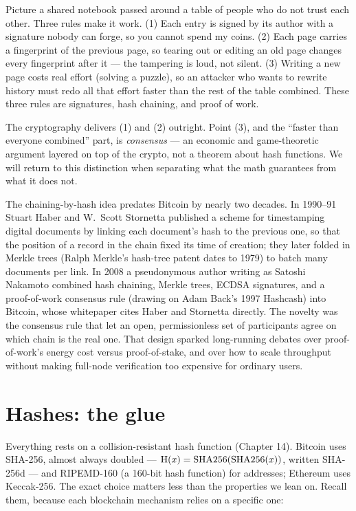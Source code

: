 \begin{intuitionbox}
Picture a shared notebook passed around a table of people who do not trust each other. Three rules make it work. (1) Each entry is signed by its author with a signature nobody can forge, so you cannot spend my coins. (2) Each page carries a fingerprint of the previous page, so tearing out or editing an old page changes every fingerprint after it --- the tampering is loud, not silent. (3) Writing a new page costs real effort (solving a puzzle), so an attacker who wants to rewrite history must redo all that effort faster than the rest of the table combined. These three rules are signatures, hash chaining, and proof of work.
\end{intuitionbox}

The cryptography delivers (1) and (2) outright. Point (3), and the ``faster than everyone combined'' part, is \emph{consensus} --- an economic and game-theoretic argument layered on top of the crypto, not a theorem about hash functions. We will return to this distinction when separating what the math guarantees from what it does not.

\begin{historybox}
The chaining-by-hash idea predates Bitcoin by nearly two decades. In 1990--91 Stuart Haber and W.~Scott Stornetta published a scheme for timestamping digital documents by linking each document's hash to the previous one, so that the position of a record in the chain fixed its time of creation; they later folded in Merkle trees (Ralph Merkle's hash-tree patent dates to 1979) to batch many documents per link. In 2008 a pseudonymous author writing as Satoshi Nakamoto combined hash chaining, Merkle trees, ECDSA signatures, and a proof-of-work consensus rule (drawing on Adam Back's 1997 Hashcash) into Bitcoin, whose whitepaper cites Haber and Stornetta directly. The novelty was the consensus rule that let an open, permissionless set of participants agree on which chain is the real one. That design sparked long-running debates over proof-of-work's energy cost versus proof-of-stake, and over how to scale throughput without making full-node verification too expensive for ordinary users.
\end{historybox}

\section{Hashes: the glue}
\label{ch36:hashes}

Everything rests on a collision-resistant hash function (Chapter 14). Bitcoin uses SHA-256, almost always doubled --- $\operatorname{H}(x) = \mathrm{SHA256}(\mathrm{SHA256}(x))$, written SHA-256d --- and RIPEMD-160 (a 160-bit hash function) for addresses; Ethereum uses Keccak-256. The exact choice matters less than the properties we lean on. Recall them, because each blockchain mechanism relies on a specific one:

